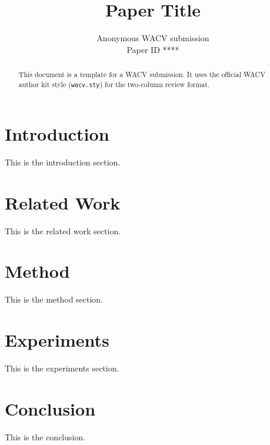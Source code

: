 \documentclass[10pt,twocolumn,letterpaper]{article}
\def\wacvPaperID{****}
\begin{document}
\title{Paper Title}

\author{Anonymous WACV submission\\
Paper ID \wacvPaperID}

\maketitle

\begin{abstract}
This document is a template for a WACV submission. It uses the official
WACV author kit style (\texttt{wacv.sty}) for the two-column review format.
\end{abstract}

\section{Introduction}
This is the introduction section.

\section{Related Work}
This is the related work section.

\section{Method}
This is the method section.

\section{Experiments}
This is the experiments section.

\section{Conclusion}
This is the conclusion.

{\small


}
\end{document}
